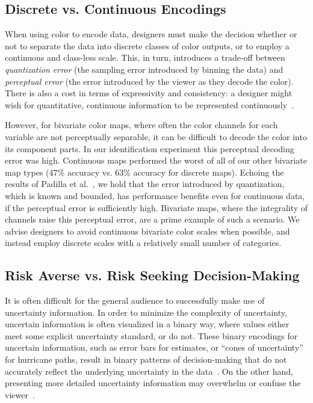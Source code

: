 \subsection{Discrete vs. Continuous Encodings}

When using color to encode data, designers must make the decision whether or not to separate the data into discrete classes of color outputs, or to employ a continuous and class-less scale. This, in turn, introduces a trade-off between \emph{quantization error} (the sampling error introduced by binning the data) and \emph{perceptual error} (the error introduced by the viewer as they decode the color). There is also a cost in terms of expressivity and consistency: a designer might wish for quantitative, continuous information to be represented continuously~\cite{mackinlay1986automating}.

However, for bivariate color maps, where often the color channels for each variable are not perceptually separable, it can be difficult to decode the color into its component parts. In our identification experiment this perceptual decoding error was high. Continuous maps performed the worst of all of our other bivariate map types (47\% accuracy vs. 63\% accuracy for discrete maps). Echoing the results of Padilla et al.~\cite{padilla2017evaluating}, we hold that the error introduced by quantization, which is known and bounded, has performance benefits even for continuous data, if the perceptual error is sufficiently high. Bivariate maps, where the integrality of channels raise this perceptual error, are a prime example of such a scenario. We advise designers to avoid continuous bivariate color scales when possible, and instead employ discrete scales with a relatively small number of categories.

\subsection{Risk Averse vs. Risk Seeking Decision-Making}

It is often difficult for the general audience to successfully make use of uncertainty information.  In order to minimize the complexity of uncertainty, uncertain information is often visualized in a binary way, where values either meet some explicit uncertainty standard, or do not. These binary encodings for uncertain information, such as error bars for estimates, or ``cones of uncertainty'' for hurricane paths, result in binary patterns of decision-making that do not accurately reflect the underlying uncertainty in the data~\cite{cox2013visualizing,correll2014error}. On the other hand, presenting more detailed uncertainty information may overwhelm or confuse the viewer~\cite{greis2017designing}.

